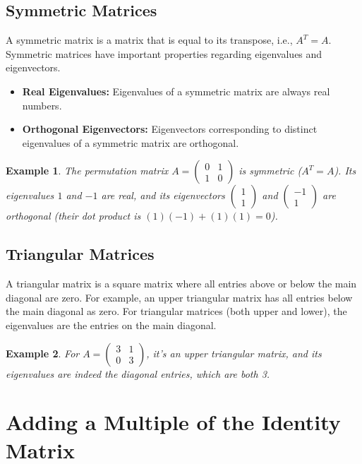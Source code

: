 \documentclass{article}
\newtheorem{example}{Example}
\begin{document}
\subsection{Symmetric Matrices}
A symmetric matrix is a matrix that is equal to its transpose, i.e., $A^T = A$. Symmetric matrices have important properties regarding eigenvalues and eigenvectors.
\begin{itemize}
    \item \textbf{Real Eigenvalues:} Eigenvalues of a symmetric matrix are always real numbers.
    \item \textbf{Orthogonal Eigenvectors:} Eigenvectors corresponding to distinct eigenvalues of a symmetric matrix are orthogonal.
\end{itemize}
\begin{example}
The permutation matrix $A = \begin{pmatrix} 0 & 1 \\ 1 & 0 \end{pmatrix}$ is symmetric ($A^T = A$). Its eigenvalues $1$ and $-1$ are real, and its eigenvectors $\begin{pmatrix} 1 \\ 1 \end{pmatrix}$ and $\begin{pmatrix} -1 \\ 1 \end{pmatrix}$ are orthogonal (their dot product is $(1)(-1) + (1)(1) = 0$).
\end{example}


\subsection{Triangular Matrices}
A triangular matrix is a square matrix where all entries above or below the main diagonal are zero. For example, an upper triangular matrix has all entries below the main diagonal as zero. For triangular matrices (both upper and lower), the eigenvalues are the entries on the main diagonal.
\begin{example}
For $A = \begin{pmatrix} 3 & 1 \\ 0 & 3 \end{pmatrix}$, it's an upper triangular matrix, and its eigenvalues are indeed the diagonal entries, which are both 3.
\end{example}


\section{Adding a Multiple of the Identity Matrix}
\end{document}
